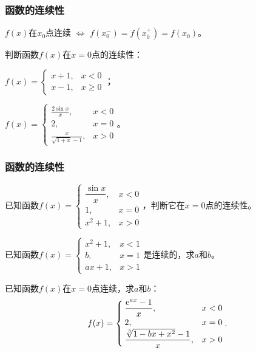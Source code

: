 \documentclass[14pt,notheorems,leqno,xcolor={rgb}]{beamer} %
\begin{document}
\begin{frame}
\frametitle{函数的连续性}
\begin{property*}
$f(x)$在$x_0$点连续 $\pmb\Leftrightarrow$ $f(x_0^-)=f(x_0^+)=f(x_0)$。
\end{property*}
\pause
\begin{example}
判断函数$f(x)$在$x=0$点的连续性：
\begin{enumlite}
  \item $f(x)=\begin{cases}x+1,&x<0\\x-1,&x\ge0\end{cases}$；
  \item $f(x)=\begin{cases}\frac{2\sin x}x,&x<0\\2,&x=0\\\frac{x}{\sqrt{1+x}-1},&x>0\end{cases}$。
\end{enumlite}
\end{example}
\end{frame}

\begin{frame}
\frametitle{函数的连续性}
\begin{exercise}
已知函数$f(x)=\begin{cases}\dfrac{\sin x}x,&x<0\\1,&x=0\\x^2+1,&x>0\end{cases}$，判断它在$x=0$点的连续性。
\end{exercise}
\end{frame}

\begin{frame}
\begin{example}
已知函数$f(x)=\begin{cases}x^2+1,&x<1\\b,&x=1\\ax+1,&x>1\end{cases}$是连续的，求$a$和$b$。
\end{example}
\vpause
\begin{exercise}
已知函数$f(x)$在$x=0$点连续，求$a$和$b$：
$$f(x)=\begin{cases}\dfrac{\mathrm{e}^{ax}-1}x,&x<0\\2,&x=0\\\dfrac{\sqrt[3]{1-bx+x^2}-1}{x},&x>0\end{cases}.$$
\end{exercise}
\end{frame}
\end{document}
